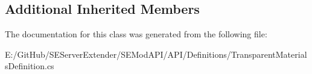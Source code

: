 \subsection*{Additional Inherited Members}


The documentation for this class was generated from the following file\+:\begin{DoxyCompactItemize}
\item 
E\+:/\+Git\+Hub/\+S\+E\+Server\+Extender/\+S\+E\+Mod\+A\+P\+I/\+A\+P\+I/\+Definitions/Transparent\+Materials\+Definition.\+cs\end{DoxyCompactItemize}
